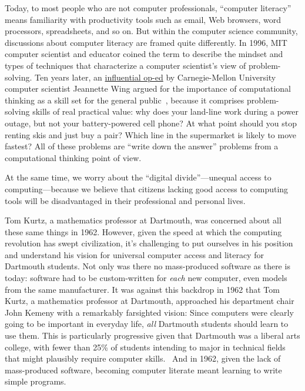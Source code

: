 \documentclass{article}
\begin{document}
Today, to most people who are not computer professionals, ``computer
literacy'' means familiarity with 
productivity tools such as email, Web browsers, word processors,
spreadsheets, and so on.  
But within the computer science community, discussions about computer
literacy are framed quite differently.  
In 1996, MIT computer scientist and educator
 coined the term  to
describe the mindset and types of techniques that
characterize a computer scientist's view of problem-solving.
Ten years later, an
\href{http://www.cs.cmu.edu/afs/cs/usr/wing/www/publications/Wing06.pdf}{influential op-ed} by Carnegie-Mellon University computer scientist
Jeannette Wing argued for the importance of computational thinking as a
skill set for the general 
public~\cite{wing_computational_thinking}, because it comprises
problem-solving skills of real practical value: why does your land-line
work during a power outage, but not your battery-powered cell phone?  At
what point should you stop renting skis and just buy a pair?  Which line
in the supermarket is likely to move fastest?  All of these problems are
``write down the answer'' problems from a computational thinking point
of view.

At the same time, we worry about the ``digital divide''---unequal access
to computing---because we believe that citizens lacking good access to
computing tools will be disadvantaged in their professional and personal
lives.

Tom Kurtz, a mathematics professor at Dartmouth, was concerned about all
these same things in 1962.
However, given the speed at which the computing revolution has swept
civilization, it's challenging to put ourselves in his position and
understand his vision for universal computer access and literacy for
Dartmouth students.
Not only was there no mass-produced software as
there is today: software  had to be custom-written for \emph{each} new
computer, even models from the same manufacturer.  
It was against this backdrop 
in 1962 that Tom Kurtz, a mathematics professor at Dartmouth, approached
his department chair John Kemeny with a remarkably farsighted vision:
Since computers were clearly going to be important in everyday
life, \emph{all} Dartmouth students should learn to use them.  This is
particularly progressive given that Dartmouth was a liberal arts college,
with fewer than 25\% of students intending to major in technical fields that might
plausibly require computer skills.~\cite{goto}
And in 1962, given the lack of mass-produced software,
becoming computer literate meant learning to
write simple programs.
\end{document}
